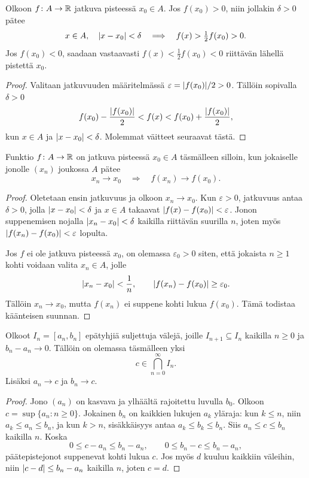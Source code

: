\documentclass[11pt,a4paper]{amsart}
\begin{document}
\begin{lemma}
  \label{lem:local-sign}
  Olkoon $f\colon A\to\mathbb{R}$ jatkuva pisteessä $x_0\in A$.
  Jos $f(x_0)>0$, niin jollakin $\delta>0$ pätee
  \[
    x\in A,\quad\lvert x-x_0\rvert<\delta
    \quad\Longrightarrow\quad f(x)>\tfrac12f(x_0)>0.
  \]
  Jos $f(x_0)<0$, saadaan vastaavasti
  $f(x)<\tfrac12f(x_0)<0$ riittävän lähellä pistettä $x_0$.
\end{lemma}
\begin{proof}
  Valitaan jatkuvuuden määritelmässä
  $\varepsilon=\lvert f(x_0)\rvert/2>0$. Tällöin sopivalla $\delta>0$
  \[
    f(x_0)-\frac{\lvert f(x_0)\rvert}2
    <f(x)<f(x_0)+\frac{\lvert f(x_0)\rvert}2,
  \]
  kun $x\in A$ ja $\lvert x-x_0\rvert<\delta$.
  Molemmat väitteet seuraavat tästä.
\end{proof}

\begin{theorem}
  \label{thm:sequential-continuity}
  Funktio $f\colon A\to\mathbb{R}$ on jatkuva pisteessä $x_0\in A$
  täsmälleen silloin, kun jokaiselle jonolle $(x_n)$ joukossa $A$
  pätee
  \[
    x_n\to x_0\quad\Longrightarrow\quad f(x_n)\to f(x_0).
  \]
\end{theorem}
\begin{proof}
  Oletetaan ensin jatkuvuus ja olkoon $x_n\to x_0$.
  Kun $\varepsilon>0$, jatkuvuus antaa $\delta>0$, jolla
  $\lvert x-x_0\rvert<\delta$ ja $x\in A$ takaavat
  $\lvert f(x)-f(x_0)\rvert<\varepsilon$.
  Jonon suppenemisen nojalla $\lvert x_n-x_0\rvert<\delta$ kaikilla
  riittävän suurilla $n$, joten myös
  $\lvert f(x_n)-f(x_0)\rvert<\varepsilon$ lopulta.

  Jos $f$ ei ole jatkuva pisteessä $x_0$, on olemassa
  $\varepsilon_0>0$ siten, että jokaista $n\ge1$ kohti voidaan
  valita $x_n\in A$, jolle
  \[
    \lvert x_n-x_0\rvert<\frac1n,
    \qquad \lvert f(x_n)-f(x_0)\rvert\ge\varepsilon_0.
  \]
  Tällöin $x_n\to x_0$, mutta $f(x_n)$ ei suppene kohti
  lukua $f(x_0)$. Tämä todistaa käänteisen suunnan.
\end{proof}

\begin{lemma}
  \label{lem:nested-intervals}
  Olkoot $I_n=[a_n,b_n]$ epätyhjiä suljettuja välejä, joille
  $I_{n+1}\subseteq I_n$ kaikilla $n\ge0$ ja $b_n-a_n\to0$.
  Tällöin on olemassa täsmälleen yksi
  \[
    c\in\bigcap_{n=0}^{\infty}I_n.
  \]
  Lisäksi $a_n\to c$ ja $b_n\to c$.
\end{lemma}
\begin{proof}
  Jono $(a_n)$ on kasvava ja ylhäältä rajoitettu luvulla $b_0$.
  Olkoon $c=\sup\{a_n:n\ge0\}$. Jokainen $b_n$ on kaikkien
  lukujen $a_k$ yläraja: kun $k\le n$, niin $a_k\le a_n\le b_n$,
  ja kun $k>n$, sisäkkäisyys antaa $a_k\le b_k\le b_n$.
  Siis $a_n\le c\le b_n$ kaikilla $n$.
  Koska
  \[
    0\le c-a_n\le b_n-a_n,
    \qquad 0\le b_n-c\le b_n-a_n,
  \]
  päätepistejonot suppenevat kohti lukua $c$.
  Jos myös $d$ kuuluu kaikkiin väleihin, niin
  $\lvert c-d\rvert\le b_n-a_n$ kaikilla $n$, joten $c=d$.
\end{proof}
\end{document}
